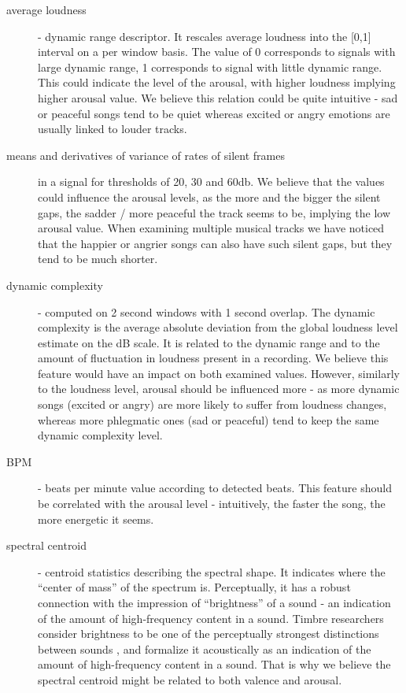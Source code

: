\begin{description}

\item[average loudness] - dynamic range descriptor. It rescales average loudness into the [0,1] interval on a per window basis. The value of 0 corresponds to signals with large dynamic range, 1 corresponds to signal with little dynamic range. This could indicate the level of the arousal, with higher loudness implying higher arousal value. We believe this relation could be quite intuitive - sad or peaceful songs tend to be quiet whereas excited or angry emotions are usually linked to louder tracks.

\item[means and derivatives of variance of rates of silent frames] in a signal for thresholds of 20, 30 and 60db. We believe that the values could influence the arousal levels, as the more and the bigger the silent gaps, the sadder / more peaceful the track seems to be, implying the low arousal value. When examining multiple musical tracks we have noticed that the happier or angrier songs can also have such silent gaps, but they tend to be much shorter.

\item[dynamic complexity] - computed on 2 second windows with 1 second overlap. The dynamic complexity is the average absolute deviation from the global loudness level estimate on the dB scale. It is related to the dynamic range and to the amount of fluctuation in loudness present in a recording. We believe this feature would have an impact on both examined values. However, similarly to the loudness level, arousal should be influenced more - as more dynamic songs (excited or angry) are more likely to suffer from loudness changes, whereas more phlegmatic ones (sad or peaceful) tend to keep the same dynamic complexity level.

\item[BPM] - beats per minute value according to detected beats. This feature should be correlated with the arousal level - intuitively, the faster the song, the more energetic it seems. 

\item[spectral centroid] - centroid statistics describing the spectral shape. It indicates where the ``center of mass'' of the spectrum is. Perceptually, it has a robust connection with the impression of ``brightness'' of a sound - an indication of the amount of high-frequency content in a sound. Timbre researchers consider brightness to be one of the perceptually strongest distinctions between sounds \cite{timber}, and formalize it acoustically as an indication of the amount of high-frequency content in a sound. That is why we believe the spectral centroid might be related to both valence and arousal.


\end{description}
